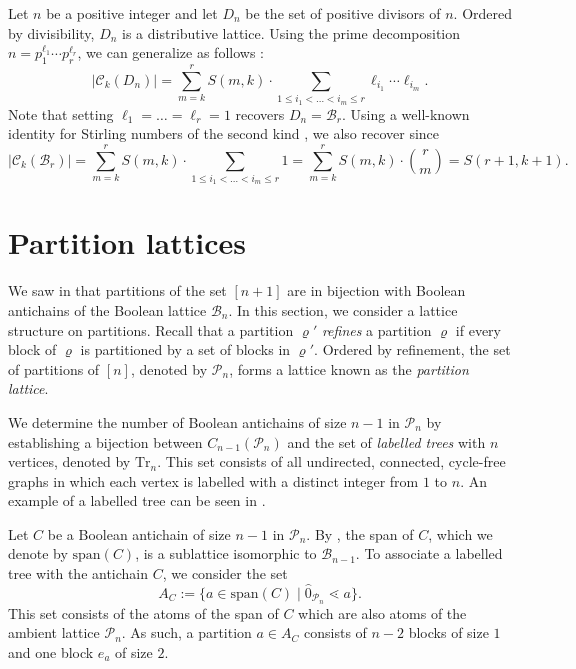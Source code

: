 \documentclass{preprint}
\newcommand{\cB}{\mathcal{B}}
\newcommand{\cC}{\mathcal{C}}
\newcommand{\cP}{\mathcal{P}}
\theoremstyle{definition}
\begin{document}
\begin{remark}
    Let $n$ be a positive integer and let $D_n$ be the set of positive divisors of $n$. Ordered by divisibility, $D_n$ is a distributive lattice.
    Using the prime decomposition $n = p_1^{\ell_1}\cdots p_r^{\ell_r}$, we can generalize  as follows \cite{garber2026combinatorial}:
    \[
        |\cC_k(D_n)| = \sum_{m=k}^r S(m,k)\cdot \sum_{1\leq i_1<\dots<i_m\leq r} \ell_{i_1}\cdots \ell_{i_m}. 
    \]
    Note that setting $\ell_1 = \dots = \ell_r = 1$ recovers $D_n = \cB_r$. Using a well-known identity for Stirling numbers of the second kind \cite[Equation (6.15)]{Stirling_numbers}, we also recover  since
    \[
        |\cC_k(\cB_r)| = \sum_{m=k}^r S(m,k)\cdot \sum_{1\leq i_1<\dots<i_m\leq r} 1 = \sum_{m=k}^r S(m,k)\cdot \binom{r}{m}=S(r+1,k+1).
    \]
\end{remark}

\section{Partition lattices}\label{sec: Partition lattices}
We saw in  that partitions of the set $[n+1]$ are in bijection with Boolean antichains of the Boolean lattice $\cB_n$. In this section, we consider a lattice structure on partitions. Recall that a partition $\varrho'$ \textit{refines} a partition $\varrho$ if every block of $\varrho$ is partitioned by a set of blocks in $\varrho'$. Ordered by refinement, the set of partitions of $[n]$, denoted by $\cP_n$, forms a lattice known as the \textit{partition lattice}.

We determine the number of Boolean antichains of size $n-1$ in $\cP_n$ by establishing a bijection between $C_{n-1}(\cP_n)$ and the set of \textit{labelled trees} with $n$ vertices, denoted by $\mathrm{Tr}_n$. This set consists of all undirected, connected, cycle-free graphs in which each vertex is labelled with a distinct integer from $1$ to $n$. An example of a labelled tree can be seen in .

Let $C$ be a Boolean antichain of size $n-1$ in $\cP_n$. By , the span of $C$, which we denote by $\text{span}(C)$, is a sublattice isomorphic to $\cB_{n-1}$. To associate a labelled tree with the antichain $C$, we consider the set
$$
A_C:=\{a \in \text{span}(C) \;|\; \hat{0}_{\cP_n}\lessdot a\}.
$$
This set consists of the atoms of the span of $C$ which are also atoms of the ambient lattice $\cP_n$. As such, a partition $a \in A_C$ consists of $n-2$ blocks of size $1$ and one block $e_a$ of size $2$.
\end{document}
